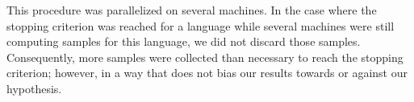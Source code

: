 \documentclass[11pt,letterpaper]{article}
\begin{document}
This procedure was parallelized on several machines.
In the case where the stopping criterion was reached for a language while several machines were still computing samples for this language, we did not discard those samples.
Consequently, more samples were collected than necessary to reach the stopping criterion; however, in a way that does not bias our results towards or against our hypothesis.






%
%
%
\end{document}
